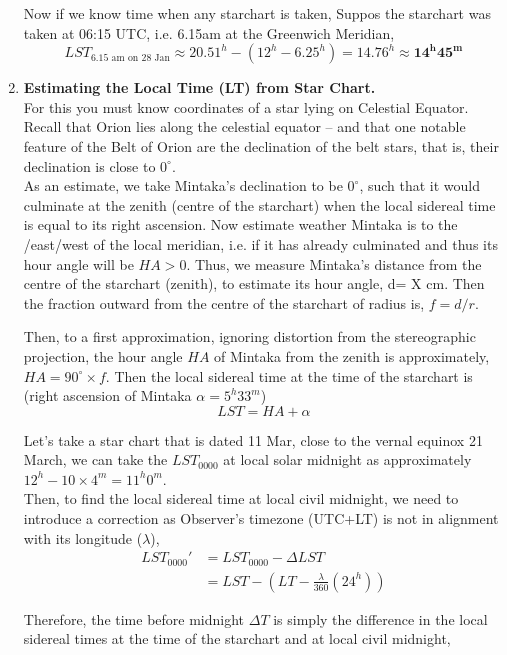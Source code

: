 \documentclass[a4paper,12pt]{extarticle}
\begin{document}
\begin{enumerate}
Now if we know time when any starchart is taken, Suppos the starchart was taken at 06:15 UTC, i.e. 6.15am at the Greenwich
Meridian,
$$LST_{\text{6.15 am on 28 Jan}} \approx 20.51^h-(12^h-6.25^h)=14.76^h \approx \mathbf{14^h45^m}$$

\item \textbf{Estimating the Local Time (LT) from Star Chart.}\\ 

For this you must know coordinates of a star lying on Celestial Equator. Recall that Orion lies along the celestial equator – and that one notable feature of the Belt of Orion are the declination of the belt stars, that is, their declination is close to $0^\circ$.\\

As an estimate, we take Mintaka’s declination to be $0^\circ$, such that it would culminate at the zenith (centre of the starchart) when the local sidereal time is equal to its right ascension. Now estimate weather Mintaka is to the /east/west of the local meridian, i.e. if it has already culminated and thus its hour angle will be $HA>0$. Thus, we measure Mintaka's distance from the centre of the starchart (zenith), to estimate its hour angle, d= X cm. Then the fraction outward from the centre of the starchart of radius is, $f=d/r$.

Then, to a first approximation, ignoring distortion from the stereographic projection, the hour angle $HA$ of Mintaka from the zenith is approximately, $HA= 90^\circ \times f$. Then the local sidereal time at the time of the starchart is (right ascension of Mintaka $\alpha=5^h 33^m$) 
$$LST=HA+\alpha$$

Let's take a star chart  that is dated 11 Mar, close to the vernal equinox 21 March, we can take the $LST_{0000}$ at local solar midnight as approximately $12^h-10\times 4^m= 11^h0^m$.\\

Then, to find the local sidereal time at local civil midnight, we need to introduce a correction as Observer's timezone (UTC+LT) is not in alignment with its longitude ($\lambda$),
\begin{align*}
	LST_{0000}'&=LST_{0000}-\Delta LST\\
	&=LST-\left(LT-\frac{\lambda}{360}(24^h)\right)
\end{align*}

Therefore, the time before midnight $\Delta T$ is simply the difference in the local sidereal times at the time of the starchart and at local civil midnight, 


\end{enumerate}
\end{document}
